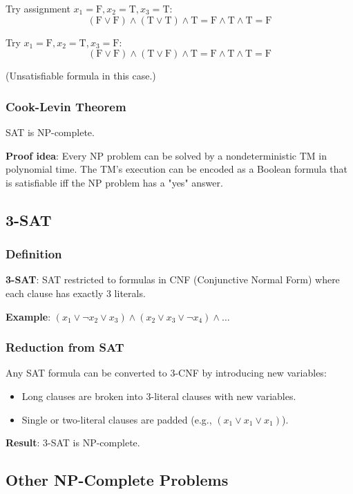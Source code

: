 \documentclass[11pt]{article}
\begin{document}
{{{Try assignment $x_1 = \text{F}, x_2 = \text{T}, x_3 = \text{T}$:
\[
(\text{F} \vee \text{F}) \wedge (\text{T} \vee \text{T}) \wedge \text{T} = \text{F} \wedge \text{T} \wedge \text{T} = \text{F}
\]

Try $x_1 = \text{F}, x_2 = \text{T}, x_3 = \text{F}$:
\[
(\text{F} \vee \text{F}) \wedge (\text{T} \vee \text{F}) \wedge \text{T} = \text{F} \wedge \text{T} \wedge \text{T} = \text{F}
\]

(Unsatisfiable formula in this case.)

\subsubsection*{Cook-Levin Theorem}
SAT is NP-complete.

\textbf{Proof idea}: Every NP problem can be solved by a nondeterministic TM in polynomial time. The TM's execution can be encoded as a Boolean formula that is satisfiable iff the NP problem has a "yes" answer.

\subsection*{3-SAT}

\subsubsection*{Definition}
\textbf{3-SAT}: SAT restricted to formulas in CNF (Conjunctive Normal Form) where each clause has exactly 3 literals.

\textbf{Example}: $(x_1 \vee \neg x_2 \vee x_3) \wedge (x_2 \vee x_3 \vee \neg x_4) \wedge \ldots$

\subsubsection*{Reduction from SAT}
Any SAT formula can be converted to 3-CNF by introducing new variables:
\begin{itemize}
\item Long clauses are broken into 3-literal clauses with new variables.
\item Single or two-literal clauses are padded (e.g., $(x_1 \vee x_1 \vee x_1)$).
\end{itemize}

\textbf{Result}: 3-SAT is NP-complete.

\subsection*{Other NP-Complete Problems}

}}}
\end{document}
